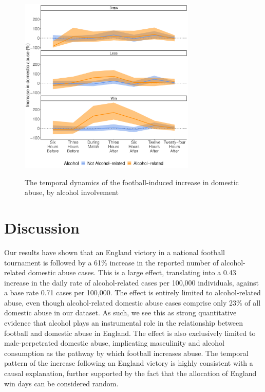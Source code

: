 \documentclass[12pt, letterpaper]{article}
\newcommand{\TM}[1] {{\textcolor{orange}{#1}}}
\newcommand{\AT}[1] {{\textcolor{blue}{#1}}}
\begin{document}
\begin{figure}
\centering
 \caption{The temporal dynamics of the football-induced increase in domestic abuse, by alcohol involvement}
\includegraphics[width=0.75\textwidth]{Threehours.pdf}
\label{fig:threehours}
\end{figure}

\newpage

\section*{Discussion}

Our results have shown that an England victory in a national football tournament is followed by a 61\% increase in the reported number of alcohol-related domestic abuse cases. This is a large effect, translating into a 0.43 increase in the daily rate of alcohol-related cases per 100,000 individuals, against a base rate 0.71 cases per 100,000. The effect is entirely limited to alcohol-related abuse, even though alcohol-related domestic abuse cases comprise only 23\% of all domestic abuse in our dataset. As such, we see this as strong quantitative evidence that alcohol plays an instrumental role in the relationship between football and domestic abuse in England. The effect is also exclusively limited to male-perpetrated domestic abuse, implicating masculinity and alcohol consumption as the pathway by which football increases abuse. The temporal pattern of the increase following an England victory is highly consistent with a causal explanation, further supported by the fact that the allocation of England win days can be considered random. %
\end{document}

